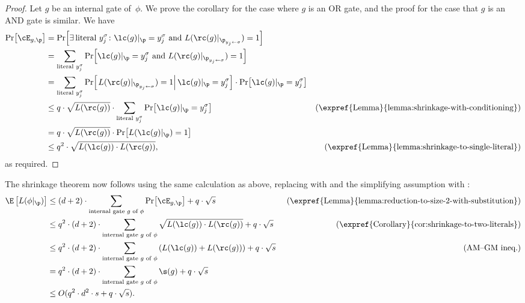 \documentclass{toc}
\begin{document}
\begin{proof}
Let $g$ be an internal gate of~$\phi$. We prove the corollary for
the case where $g$ is an OR gate, and the proof for the case that
$g$ is an AND gate is similar. We have 
\begin{align*}
\Pr\!\left[\cE_{g,\p}\right] & =\Pr\!\left[\exists\,\text{literal }y_{j}^{\sigma}\colon\lc(g)|_{\p}=y_{j}^{\sigma}\text{ and }L(\rc(g)|_{\p_{y_{j}\gets\sigma}})=1\right]\\
 & =\sum_{\text{literal }y_{j}^{\sigma}}\Pr\!\left[\lc(g)|_{\p}=y_{j}^{\sigma}\text{ and }L(\rc(g)|_{\p_{y_{j}\gets\sigma}})=1\right]\\
 & =\sum_{\text{literal }y_{j}^{\sigma}}\Pr\!\left[\left.L(\rc(g)|_{\p_{y_{j}\gets\sigma}})=1\right|\lc(g)|_{\p}=y_{j}^{\sigma}\right]\cdot\Pr\!\left[\lc(g)|_{\p}=y_{j}^{\sigma}\right]\\
 & \le q\cdot\sqrt{L(\rc(g))}\cdot\sum_{\text{literal }y_{j}^{\sigma}}\Pr\!\left[\lc(g)|_{\p}=y_{j}^{\sigma}\right] & \text{(\expref{Lemma}{lemma:shrinkage-with-conditioning})}\\
 & =q\cdot\sqrt{L(\rc(g))}\cdot\Pr\!\left[L(\lc(g)|_{\p})=1\right]\\
 & \le q^{2}\cdot\sqrt{L(\lc(g))\cdot L(\rc(g))}, & \text{(\expref{Lemma}{lemma:shrinkage-to-single-literal})}
\end{align*}
as required. 
\end{proof}
The shrinkage theorem now follows using the same calculation as above,
replacing  with 
and the simplifying assumption with :
\begin{align*}
\E\left[L(\phi|_{\p})\right] & \le(d+2)\cdot\sum_{\text{internal gate \ensuremath{g} of \ensuremath{\phi}}}\Pr\!\left[\cE_{g,\p}\right]+q\cdot\sqrt{s} & \ \text{(\expref{Lemma}{lemma:reduction-to-size-2-with-substitution})}\\
 & \le q^{2}\cdot(d+2)\cdot\sum_{\text{internal gate \ensuremath{g} of \ensuremath{\phi}}}\sqrt{L(\lc(g))\cdot L(\rc(g))}+q\cdot\sqrt{s} & \ \text{(\expref{Corollary}{cor:shrinkage-to-two-literals})}\\
& \le q^{2}\cdot(d+2)\cdot\sum_{\text{internal gate \ensuremath{g} of \ensuremath{\phi}}}\left(L(\lc(g))+L(\rc(g))\right)+q\cdot\sqrt{s} &
%
\ \text{(AM--GM ineq.)}\\   %
 & =q^{2}\cdot(d+2)\cdot\sum_{\text{internal gate \ensuremath{g} of \ensuremath{\phi}}}\s(g)+q\cdot\sqrt{s}\\
 & \le O(q^{2}\cdot d^{2}\cdot s+q\cdot\sqrt{s}).
\end{align*}
\end{document}
